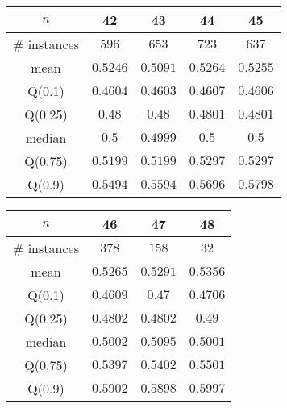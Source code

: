 \begin{tabular}{c|cccc} 
\hline 
$n$ & 42 & 43 & 44 & 45 \tabularnewline 
\hline 
\hline 
\# instances & $596$ & $653$ & $723$ & $637$ \tabularnewline 
mean & $0.5246$ & $0.5091$ & $0.5264$ & $0.5255$ \tabularnewline 
Q(0.1) & $0.4604$ & $0.4603$ & $0.4607$ & $0.4606$ \tabularnewline 
Q(0.25) & $0.48$ & $0.48$ & $0.4801$ & $0.4801$ \tabularnewline 
median & $0.5$ & $0.4999$ & $0.5$ & $0.5$ \tabularnewline 
Q(0.75) & $0.5199$ & $0.5199$ & $0.5297$ & $0.5297$ \tabularnewline 
Q(0.9) & $0.5494$ & $0.5594$ & $0.5696$ & $0.5798$ \tabularnewline 
\hline 
\end{tabular} 
\medskip{} 

\begin{tabular}{c|ccc} 
\hline 
$n$ & 46 & 47 & 48 \tabularnewline 
\hline 
\hline 
\# instances & $378$ & $158$ & $32$ \tabularnewline 
mean & $0.5265$ & $0.5291$ & $0.5356$ \tabularnewline 
Q(0.1) & $0.4609$ & $0.47$ & $0.4706$ \tabularnewline 
Q(0.25) & $0.4802$ & $0.4802$ & $0.49$ \tabularnewline 
median & $0.5002$ & $0.5095$ & $0.5001$ \tabularnewline 
Q(0.75) & $0.5397$ & $0.5402$ & $0.5501$ \tabularnewline 
Q(0.9) & $0.5902$ & $0.5898$ & $0.5997$ \tabularnewline 
\hline 
\end{tabular} 
\medskip{} 

